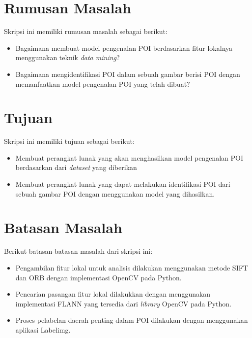 \section{Rumusan Masalah}
\label{sec:rumusan}
Skripsi ini memiliki rumusan masalah sebagai berikut:
\begin{itemize}
	\item Bagaimana membuat model pengenalan POI berdasarkan fitur lokalnya menggunakan teknik \textit{data mining}?
	\item Bagaimana mengidentifikasi POI dalam sebuah gambar berisi POI dengan memanfaatkan model pengenalan POI yang telah dibuat?
\end{itemize}

\section{Tujuan}
\label{sec:tujuan}
Skripsi ini memiliki tujuan sebagai berikut:
\begin{itemize}
	\item Membuat perangkat lunak yang akan menghasilkan model pengenalan POI berdasarkan dari \textit{dataset} yang diberikan
	\item Membuat perangkat lunak yang dapat melakukan identifikasi POI dari sebuah gambar POI dengan menggunakan model yang dihasilkan.
\end{itemize}

\section{Batasan Masalah}
\label{sec:batasan}
Berikut batasan-batasan masalah dari skripsi ini:
\begin{itemize}
	\item Pengambilan fitur lokal untuk analisis dilakukan menggunakan metode SIFT dan ORB dengan implementasi OpenCV pada Python.
	\item Pencarian pasangan fitur lokal dilakukkan dengan menggunakan implementasi FLANN yang tersedia dari \textit{library} OpenCV pada Python.
	\item Proses pelabelan daerah penting dalam POI dilakukan dengan menggunakan aplikasi Labelimg.
\end{itemize}

